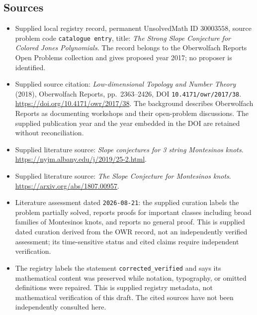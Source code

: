 \documentclass[11pt]{article}
\begin{document}
\subsection{Sources}
\begin{itemize}
\item Supplied local registry record, permanent UnsolvedMath ID \(30003558\), source problem code \texttt{catalogue entry}, title: \emph{The Strong Slope Conjecture for Colored Jones Polynomials}. The record belongs to the Oberwolfach Reports Open Problems collection and gives proposed year 2017; no proposer is identified.
\item Supplied source citation: \emph{Low-dimensional Topology and Number Theory} (2018), Oberwolfach Reports, pp.\ 2363--2426, DOI \texttt{10.4171/owr/2017/38}. \url{https://doi.org/10.4171/owr/2017/38}. The background describes Oberwolfach Reports as documenting workshops and their open-problem discussions. The supplied publication year and the year embedded in the DOI are retained without reconciliation.
\item Supplied literature source: \emph{Slope conjectures for 3 string Montesinos knots}. \url{https://nyjm.albany.edu/j/2019/25-2.html}.
\item Supplied literature source: \emph{The Slope Conjecture for Montesinos knots}. \url{https://arxiv.org/abs/1807.00957}.
\item Literature assessment dated \texttt{2026-08-21}: the supplied curation labels the problem partially solved, reports proofs for important classes including broad families of Montesinos knots, and reports no general proof. This is supplied dated curation derived from the OWR record, not an independently verified assessment; its time-sensitive status and cited claims require independent verification.
\item The registry labels the statement \texttt{corrected\_verified} and says its mathematical content was preserved while notation, typography, or omitted definitions were repaired. This is supplied registry metadata, not mathematical verification of this draft. The cited sources have not been independently consulted here.
\end{itemize}
\end{document}
